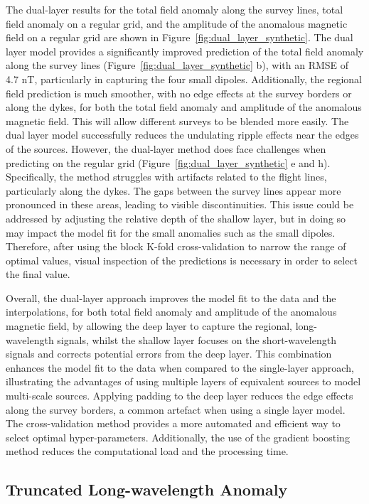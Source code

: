 The dual-layer results for the total field anomaly along the survey lines, total field anomaly on a regular grid, and the amplitude of the anomalous magnetic field on a regular grid are shown in Figure~\ref{fig:dual_layer_synthetic}. The dual layer model provides a significantly improved prediction of the total field anomaly along the survey lines (Figure~\ref{fig:dual_layer_synthetic} b), with an RMSE of 4.7 nT, particularly in capturing the four small dipoles. Additionally, the regional field prediction is much smoother, with no edge effects at the survey borders or along the dykes, for both the total field anomaly and amplitude of the anomalous magnetic field. This will allow different surveys to be blended more easily. The dual layer model successfully reduces the undulating ripple effects near the edges of the sources. However, the dual-layer method does face challenges when predicting on the regular grid (Figure~\ref{fig:dual_layer_synthetic} e and h). Specifically, the method struggles with artifacts related to the flight lines, particularly along the dykes. The gaps between the survey lines appear more pronounced in these areas, leading to visible discontinuities. This issue could be addressed by adjusting the relative depth of the shallow layer, but in doing so may impact the model fit for the small anomalies such as the small dipoles. Therefore, after using the block K-fold cross-validation to narrow the range of optimal values, visual inspection of the predictions is necessary in order to select the final value.

Overall, the dual-layer approach improves the model fit to the data and the interpolations, for both total field anomaly and amplitude of the anomalous magnetic field, by allowing the deep layer to capture the regional, long-wavelength signals, whilst the shallow layer focuses on the short-wavelength signals and corrects potential errors from the deep layer. This combination enhances the model fit to the data when compared to the single-layer approach, illustrating the advantages of using multiple layers of equivalent sources to model multi-scale sources. Applying padding to the deep layer reduces the edge effects along the survey borders, a common artefact when using a single layer model. The cross-validation method provides a more automated and efficient way to select optimal hyper-parameters. Additionally, the use of the gradient boosting method reduces the computational load and the processing time.

\subsection{Truncated Long-wavelength Anomaly}
\label{sec:truncated_regional}

